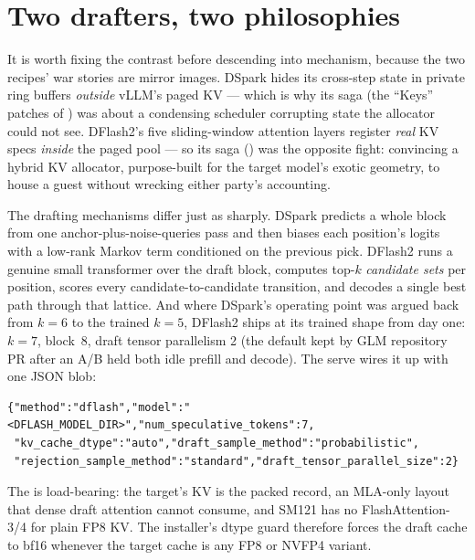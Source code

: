 \section{Two drafters, two philosophies}
\label{sec:dflash2-contrast}

It is worth fixing the contrast before descending into mechanism, because
the two recipes' war stories are mirror images. DSpark hides its cross-step
state in private ring buffers \emph{outside} vLLM's paged KV --- which is why
its saga (the ``Keys'' patches of ) was about a
condensing scheduler corrupting state the allocator could not see. DFlash2's
five sliding-window attention layers register \emph{real} KV specs
\emph{inside} the paged pool --- so its saga
() was the opposite fight: convincing a hybrid KV
allocator, purpose-built for the target model's exotic geometry, to house a
guest without wrecking either party's accounting.

The drafting mechanisms differ just as sharply. DSpark predicts a whole
block from one anchor-plus-noise-queries pass and then biases each position's
logits with a low-rank Markov term conditioned on the previous pick. DFlash2
runs a genuine small transformer over the draft block, computes top-$k$
\emph{candidate sets} per position, scores every candidate-to-candidate
transition, and decodes a single best path through that lattice. And where
DSpark's operating point was argued back from $k{=}6$ to the trained
$k{=}5$, DFlash2 ships at its trained shape from day one: $k{=}7$, block~8,
draft tensor parallelism 2 (the  default kept by
GLM repository PR  after an A/B held both idle prefill and decode).
The serve wires it up with one JSON blob:

\begin{lstlisting}[language=jsonhb]
{"method":"dflash","model":"<DFLASH_MODEL_DIR>","num_speculative_tokens":7,
 "kv_cache_dtype":"auto","draft_sample_method":"probabilistic",
 "rejection_sample_method":"standard","draft_tensor_parallel_size":2}
\end{lstlisting}

The  is load-bearing: the target's KV is the
packed  record, an MLA-only layout that dense draft
attention cannot consume, and SM121 has no FlashAttention-3/4 for plain FP8
KV. The installer's dtype guard therefore forces the draft cache to bf16
whenever the target cache is any FP8 or NVFP4 variant.

